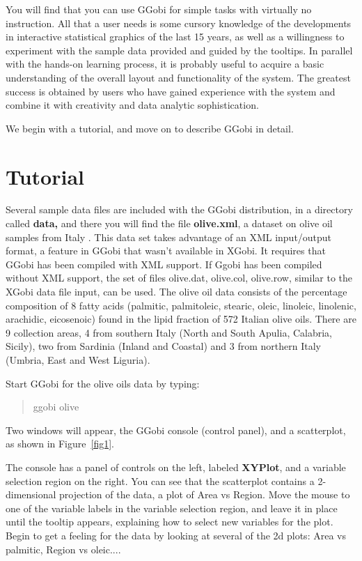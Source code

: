 \documentclass[11pt]{article}
\begin{document}
You will find that you can use GGobi for simple tasks with virtually
no instruction.  All that a user needs is some cursory knowledge of
the developments in interactive statistical graphics of the last 15
years, as well as a willingness to experiment with the sample data
provided and guided by the tooltips.  In parallel with the hands-on
learning process, it is probably useful to acquire a basic
understanding of the overall layout and functionality of the system.
The greatest success is obtained by users who have gained experience
with the system and combine it with creativity and data analytic
sophistication.

We begin with a tutorial, and move on to describe GGobi in detail.

\section{Tutorial}

Several sample data files are included with the GGobi distribution, in
a directory called {\bf data,} and there you will find the file {\bf
olive.xml}, a dataset on olive oil samples from Italy \cite{FALT83}.
This data set takes advantage of an XML input/output format, a feature
in GGobi that wasn't available in XGobi. It requires that GGobi has
been compiled with XML support. If Ggobi has been compiled without XML
support, the set of files olive.dat, olive.col, olive.row, similar to
the XGobi data file input, can be used. The olive oil data consists of
the percentage composition of 8 fatty acids (palmitic, palmitoleic,
stearic, oleic, linoleic, linolenic, arachidic, eicosenoic) found in
the lipid fraction of 572 Italian olive oils. There are 9 collection
areas, 4 from southern Italy (North and South Apulia, Calabria,
Sicily), two from Sardinia (Inland and Coastal) and 3 from northern
Italy (Umbria, East and West Liguria).

Start GGobi for the olive oils data by typing:

\begin{quote}
ggobi olive
\end{quote}

Two windows will appear, the GGobi console (control panel),
and a scatterplot, as shown in Figure~\ref{fig1}.

The console has a panel of controls on the left, labeled {\bf
XYPlot}, and a variable selection region on the right.  You can see
that the scatterplot contains a 2-dimensional projection of the data,
a plot of Area vs Region.  Move the mouse to one of the variable labels
in the variable selection region, and leave it in place until the
tooltip appears, explaining how to select new variables for the
plot.   Begin to get a feeling for the data by looking at several of
the 2d plots:  Area vs palmitic, Region vs oleic....
\end{document}
